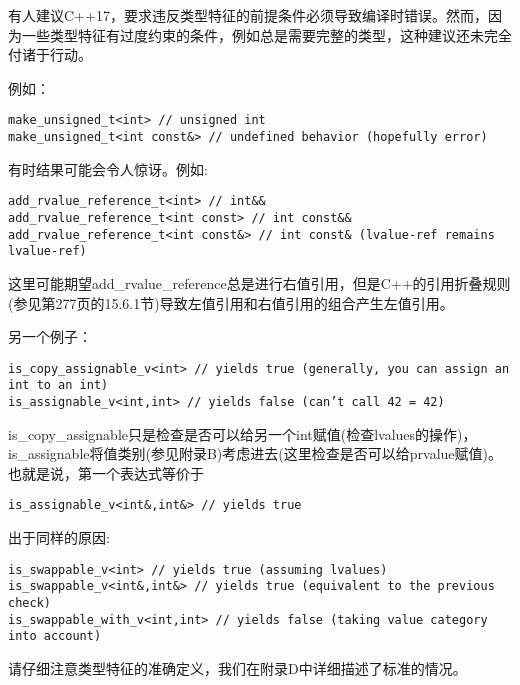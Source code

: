 \begin{tcolorbox}[colback=webgreen!5!white,colframe=webgreen!75!black]
\hspace*{0.75cm}有人建议C++17，要求违反类型特征的前提条件必须导致编译时错误。然而，因为一些类型特征有过度约束的条件，例如总是需要完整的类型，这种建议还未完全付诸于行动。
\end{tcolorbox}

例如：

\begin{lstlisting}[style=styleCXX]
make_unsigned_t<int> // unsigned int
make_unsigned_t<int const&> // undefined behavior (hopefully error)
\end{lstlisting}

有时结果可能会令人惊讶。例如:

\begin{lstlisting}[style=styleCXX]
add_rvalue_reference_t<int> // int&&
add_rvalue_reference_t<int const> // int const&&
add_rvalue_reference_t<int const&> // int const& (lvalue-ref remains lvalue-ref)
\end{lstlisting}

这里可能期望add\_rvalue\_reference总是进行右值引用，但是C++的引用折叠规则(参见第277页的15.6.1节)导致左值引用和右值引用的组合产生左值引用。

另一个例子：

\begin{lstlisting}[style=styleCXX]
is_copy_assignable_v<int> // yields true (generally, you can assign an int to an int)
is_assignable_v<int,int> // yields false (can’t call 42 = 42)
\end{lstlisting}

is\_copy\_assignable只是检查是否可以给另一个int赋值(检查lvalues的操作)，is\_assignable将值类别(参见附录B)考虑进去(这里检查是否可以给prvalue赋值)。也就是说，第一个表达式等价于

\begin{lstlisting}[style=styleCXX]
is_assignable_v<int&,int&> // yields true
\end{lstlisting}

出于同样的原因:

\begin{lstlisting}[style=styleCXX]
is_swappable_v<int> // yields true (assuming lvalues)
is_swappable_v<int&,int&> // yields true (equivalent to the previous check)
is_swappable_with_v<int,int> // yields false (taking value category into account)
\end{lstlisting}

请仔细注意类型特征的准确定义，我们在附录D中详细描述了标准的情况。

